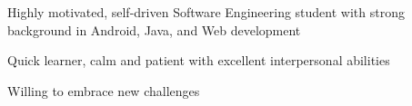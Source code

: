 \vspace{-1.0em}%
\begin{cventries}
  \cventry
    {}
    {}
    {}
    {}
    {
      \begin{cvitems}
      \vspace{-1.5em}%
        \item {Highly motivated, self-driven Software Engineering student with strong background in Android, Java,
and Web development}
        \item {Quick learner, calm and patient with excellent interpersonal abilities}
        \item {Willing
to embrace new challenges}
      \end{cvitems}
    }
\end{cventries}
\vspace{-1.0em}%
